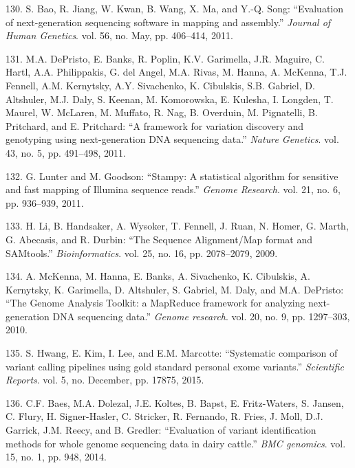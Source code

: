 \documentclass[12pt,twoside]{reedthesis}
\theoremstyle{definition}
\theoremstyle{definition}
\theoremstyle{remark}
\begin{document}
  \hypertarget{ref-Bao2011}{}
  130. S. Bao, R. Jiang, W. Kwan, B. Wang, X. Ma, and Y.-Q. Song:
  ``Evaluation of next-generation sequencing software in mapping and
  assembly.'' \emph{Journal of Human Genetics}. vol. 56, no. May, pp.
  406--414, 2011.
  
  \hypertarget{ref-DePristo2011}{}
  131. M.A. DePristo, E. Banks, R. Poplin, K.V. Garimella, J.R. Maguire,
  C. Hartl, A.A. Philippakis, G. del Angel, M.A. Rivas, M. Hanna, A.
  McKenna, T.J. Fennell, A.M. Kernytsky, A.Y. Sivachenko, K. Cibulskis,
  S.B. Gabriel, D. Altshuler, M.J. Daly, S. Keenan, M. Komorowska, E.
  Kulesha, I. Longden, T. Maurel, W. McLaren, M. Muffato, R. Nag, B.
  Overduin, M. Pignatelli, B. Pritchard, and E. Pritchard: ``A framework
  for variation discovery and genotyping using next-generation DNA
  sequencing data.'' \emph{Nature Genetics}. vol. 43, no. 5, pp. 491--498,
  2011.
  
  \hypertarget{ref-Lunter2011}{}
  132. G. Lunter and M. Goodson: ``Stampy: A statistical algorithm for
  sensitive and fast mapping of Illumina sequence reads.'' \emph{Genome
  Research}. vol. 21, no. 6, pp. 936--939, 2011.
  
  \hypertarget{ref-Li2009}{}
  133. H. Li, B. Handsaker, A. Wysoker, T. Fennell, J. Ruan, N. Homer, G.
  Marth, G. Abecasis, and R. Durbin: ``The Sequence Alignment/Map format
  and SAMtools.'' \emph{Bioinformatics}. vol. 25, no. 16, pp. 2078--2079,
  2009.
  
  \hypertarget{ref-McKenna2010}{}
  134. A. McKenna, M. Hanna, E. Banks, A. Sivachenko, K. Cibulskis, A.
  Kernytsky, K. Garimella, D. Altshuler, S. Gabriel, M. Daly, and M.A.
  DePristo: ``The Genome Analysis Toolkit: a MapReduce framework for
  analyzing next-generation DNA sequencing data.'' \emph{Genome research}.
  vol. 20, no. 9, pp. 1297--303, 2010.
  
  \hypertarget{ref-Hwang2015}{}
  135. S. Hwang, E. Kim, I. Lee, and E.M. Marcotte: ``Systematic
  comparison of variant calling pipelines using gold standard personal
  exome variants.'' \emph{Scientific Reports}. vol. 5, no. December, pp.
  17875, 2015.
  
  \hypertarget{ref-Baes2014}{}
  136. C.F. Baes, M.A. Dolezal, J.E. Koltes, B. Bapst, E. Fritz-Waters, S.
  Jansen, C. Flury, H. Signer-Hasler, C. Stricker, R. Fernando, R. Fries,
  J. Moll, D.J. Garrick, J.M. Reecy, and B. Gredler: ``Evaluation of
  variant identification methods for whole genome sequencing data in dairy
  cattle.'' \emph{BMC genomics}. vol. 15, no. 1, pp. 948, 2014.
  
\end{document}
